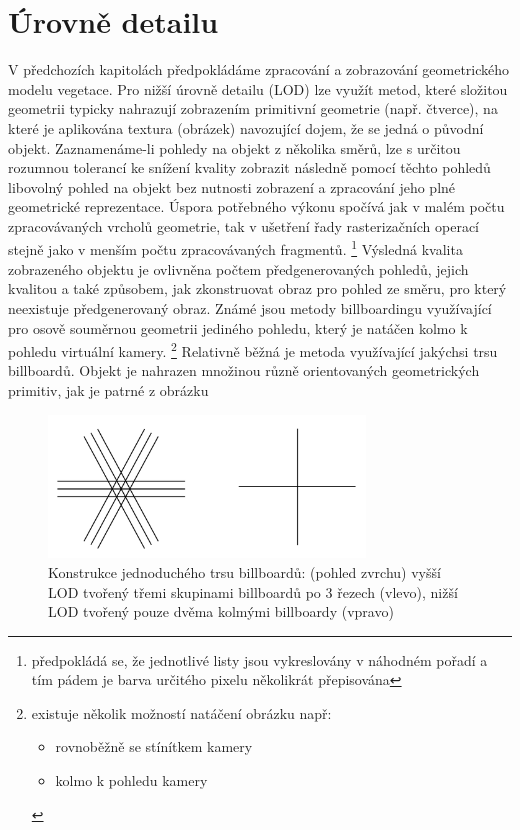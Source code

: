 \section{Úrovně detailu}
\label{sec-LOD}
V předchozích kapitolách předpokládáme zpracování a zobrazování geometrického modelu vegetace. Pro nižší úrovně detailu (LOD) lze využít metod, které složitou geometrii typicky nahrazují zobrazením primitivní geometrie (např. čtverce), na které je aplikována textura (obrázek) navozující dojem, že se jedná o původní objekt. Zaznamenáme-li pohledy na objekt z několika směrů, lze s určitou rozumnou tolerancí ke snížení kvality zobrazit následně pomocí těchto pohledů libovolný pohled na objekt bez nutnosti zobrazení a zpracování jeho plné geometrické reprezentace. Úspora potřebného výkonu spočívá jak v malém počtu zpracovávaných vrcholů geometrie, tak v ušetření řady rasterizačních operací stejně jako v menším počtu zpracovávaných fragmentů.
\footnote{ předpokládá se, že jednotlivé listy jsou vykreslovány v náhodném pořadí a tím pádem je barva určitého pixelu několikrát přepisována}
 Výsledná kvalita zobrazeného objektu je ovlivněna počtem předgenerovaných pohledů, jejich kvalitou a také způsobem, jak zkonstruovat obraz pro pohled ze směru, pro který neexistuje předgenerovaný obraz.
Známé jsou metody billboardingu využívající pro osově souměrnou geometrii jediného pohledu, který je natáčen kolmo k pohledu virtuální kamery. \footnote{existuje několik možností natáčení obrázku např:
\begin{itemize}
\item rovnoběžně se stínítkem kamery
\item kolmo k pohledu kamery
\end{itemize}
}
Relativně běžná je metoda využívající jakýchsi trsu billboardů. Objekt je nahrazen množinou různě orientovaných geometrických primitiv, jak je patrné z obrázku 
\begin{figure}[!hbt]
\begin{center}
\includegraphics[width=0.75\textwidth]{./figures/slicesTop.png}
\caption[Konstrukce jednoduchého trsu billboardů]%
{ Konstrukce jednoduchého trsu billboardů: (pohled zvrchu) vyšší LOD tvořený třemi skupinami billboardů po 3 řezech (vlevo), nižší LOD tvořený pouze dvěma kolmými billboardy (vpravo) }
\end{center}
\label{fig:sliceBilboard}
\end{figure}

